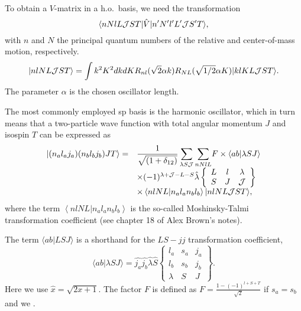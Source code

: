 \documentclass[graybox,sectrefs,envcountresetchap,open=right]{svmonodo}
\begin{document}
To obtain a $V$-matrix in a h.o.~basis, we need  
the transformation
\[
     \langle nNlL{\cal J}ST\vert\hat{V}\vert n'N'l'L'{\cal J}S'T\rangle,
\]
with $n$ and $N$ the principal quantum numbers of the relative and
center-of-mass motion, respectively.
\[
   \vert nlNL{\cal J}ST\rangle= \int k^{2}K^{2}dkdKR_{nl}(\sqrt{2}\alpha k)
R_{NL}(\sqrt{1/2}\alpha K)
\vert klKL{\cal J}ST\rangle.
\]
The parameter $\alpha$ is the chosen oscillator length.



The most commonly employed sp basis is the harmonic oscillator, which
in turn means that
a two-particle wave function with total angular momentum $J$
and isospin $T$
can be expressed as 
\[
\begin{array}{ll}
\vert (n_{a}l_{a}j_{a})(n_{b}l_{b}j_{b})JT\rangle =&
{\displaystyle
\frac{1}{\sqrt{(1+\delta_{12})}}
\sum_{\lambda S{\cal J}}\sum_{nNlL}}
F\times \langle ab|\lambda SJ \rangle\\
&\times (-1)^{\lambda +{\cal J}-L-S}\hat{\lambda}
\left\{\begin{array}{ccc}L&l&\lambda\\S&J&{\cal J}
\end{array}\right\}\\
&\times \left\langle nlNL| n_al_an_bl_b\right\rangle
\vert nlNL{\cal J}ST\rangle ,\end{array}
\label{eq:hoho}
\]
where the term
$\left\langle nlNL| n_al_an_bl_b\right\rangle$
is the so-called Moshinsky-Talmi transformation coefficient (see chapter 18 of Alex Brown's notes).



The term $\langle ab|LSJ \rangle $ is a shorthand
for the $LS-jj$ transformation coefficient,
\[
     \langle ab|\lambda SJ \rangle = \hat{j_{a}}\hat{j_{b}}
     \hat{\lambda}\hat{S}
     \left\{
    \begin{array}{ccc}
       l_{a}&s_a&j_{a}\\
       l_{b}&s_b&j_{b}\\
       \lambda    &S          &J
    \end{array}
    \right\}.
\]
Here
we use $\hat{x} = \sqrt{2x +1}$.
The factor $F$ is defined as $F=\frac{1-(-1)^{l+S+T}}{\sqrt{2}}$ if
$s_a = s_b$ and we .
\end{document}
